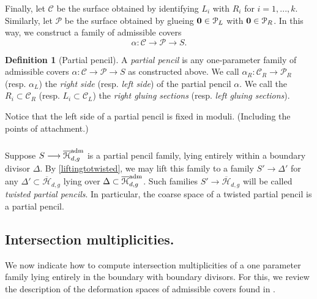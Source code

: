 \documentclass[reqno, 10 pt]{article}
\theoremstyle{definition}
\newtheorem{defn}[thm]{Definition}
\theoremstyle{remark}
\numberwithin{equation}{section}
\numberwithin{thm}{section}
\numberwithin{prop}{section}
\numberwithin{lem}{section}
\numberwithin{cor}{section}
\numberwithin{conj}{section}
\numberwithin{defn}{section}
\renewcommand{\H}{\mathcal H}
\newcommand{\Hdg}{\overline{\H}_{d,g}}
\newcommand{\Hdgn}{\overline{\H}_{d,g}}
\renewcommand{\to}{\longrightarrow}
\newcommand{\cC}{{\mathcal C}}
\newcommand{\cP}{{\mathcal P}}
\newcommand {\from}{{\colon}}
\renewcommand{\H}{{\mathcal{H}}}
\begin{document}
  \subsubsection{}   
    Finally, let $\cC$ be the surface obtained by identifying $L_{i}$ with $R_{i}$ for $i = 1, ... ,k$. Similarly, let $\cP$ be the surface obtained by glueing ${\bf 0} \in \cP_{L}$ with ${\bf 0} \in \cP_{R}$.  In this way, we construct a family of admissible covers \[\alpha \from \cC \to \cP \to S.\]
    \begin{defn}[Partial pencil]\label{ppencil}
    A {\sl partial pencil} is any one-parameter family of admissible covers $\alpha \from \cC \to \cP \to S$ as constructed above. We call $\alpha_R \from \cC_{R} \to \cP_{R}$ (resp. $\alpha_{L}$) the {\sl right side} (resp. {\sl left side}) of the partial pencil $\alpha$. We call the $R_{i} \subset \cC_{R}$ (resp. $ L_{i} \subset \cC_{L}$) the {\sl right gluing sections} (resp. {\sl left gluing sections}).
    \end{defn}

    Notice that the left side of a partial pencil is fixed in moduli. (Including the points of attachment.) 
  \subsubsection{}  

     Suppose $S \to \Hdg^{\rm{adm}}$ is a partial pencil family, lying entirely within a boundary divisor $\Delta$.  By \autoref{liftingtotwisted}, we may lift this family to a family $S' \to \Delta'$ for any $\Delta' \subset \Hdgn$ lying over $\Delta \subset \Hdg^{\rm{adm}}$. Such families $S' \to \Hdgn$ will be called {\sl twisted partial pencils}.  In particular, the coarse space of a twisted partial pencil is a partial pencil.


\subsection{Intersection multiplicities.}\label{intersectionmultiplicities}

  We now indicate how to compute intersection multiplicities of a one parameter family lying entirely in the boundary with boundary divisors.  For this, we review the description of the deformation spaces of admissible covers found in \cite{Harris82:_Kodair_Dimen_Of_Modul_Space_Of_Curves}. 
\end{document}
